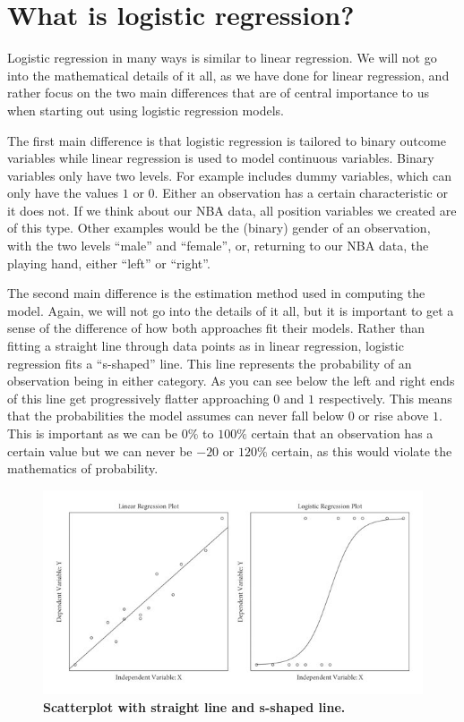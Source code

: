 \documentclass[
]{book}
\begin{document}
\hypertarget{what-is-logistic-regression}{%
\section{What is logistic regression?}\label{what-is-logistic-regression}}

Logistic regression in many ways is similar to linear regression. We
will not go into the mathematical details of it all, as we have done for
linear regression, and rather focus on the two main differences that are
of central importance to us when starting out using logistic regression
models.

The first main difference is that logistic regression is tailored to
binary outcome variables while linear regression is used to model
continuous variables. Binary variables only have two levels.
For example includes dummy variables, which can only have the values \(1\) or
\(0\). Either an observation has a certain characteristic or it does not.
If we think about our NBA data, all position variables we created are of
this type. Other examples would be the (binary) gender of an observation, with
the two levels ``male'' and ``female'', or, returning to our NBA data, the
playing hand, either ``left'' or ``right''.

The second main difference is the estimation method used in computing
the model. Again, we will not go into the details of it all, but it is
important to get a sense of the difference of how both approaches fit
their models. Rather than fitting a straight line through data points as
in linear regression, logistic regression fits a ``s-shaped'' line. This
line represents the probability of an observation being in either
category. As you can see below the left and right ends of this line get
progressively flatter approaching \(0\) and \(1\) respectively. This means
that the probabilities the model assumes can never fall below \(0\) or
rise above \(1\). This is important as we can be \(0\%\) to \(100\%\) certain
that an observation has a certain value but we can never be \(-20%
\) or
\(120\%\) certain, as this would violate the mathematics of probability.

\begin{figure}
\centering
\includegraphics{linear-vs-logistic.png}
\caption{\textbf{Scatterplot with straight line and s-shaped
line.}}
\end{figure}
\end{document}
